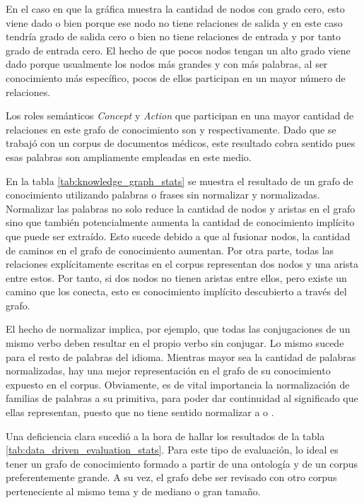 En el caso en que la gráfica muestra la cantidad de nodos con grado cero, esto viene dado o bien porque ese nodo no tiene relaciones de salida y en este caso tendría grado de salida cero o bien no tiene relaciones de entrada y por tanto grado de entrada cero. El hecho de que pocos nodos tengan un alto grado viene dado porque usualmente los nodos más grandes y con más palabras, al ser conocimiento más específico, pocos de ellos participan en un mayor número de relaciones.

Los roles semánticos \textit{Concept} y \textit{Action} que participan en una mayor cantidad de relaciones en este grafo de conocimiento son  y  respectivamente. Dado que se trabajó con un corpus de documentos médicos, este resultado cobra sentido pues esas palabras son ampliamente empleadas en este medio.

En la tabla \ref{tab:knowledge_graph_stats} se muestra el resultado de un grafo de conocimiento utilizando palabras o frases sin normalizar y normalizadas. Normalizar las palabras no solo reduce la cantidad de nodos y aristas en el grafo sino que también potencialmente aumenta la cantidad de conocimiento implícito que puede ser extraído. Esto sucede debido a que al fusionar nodos, la cantidad de caminos en el grafo de conocimiento aumentan. Por otra parte, todas las relaciones explícitamente escritas en el corpus representan dos nodos y una arista entre estos. Por tanto, si dos nodos no tienen aristas entre ellos, pero existe un camino que los conecta, esto es conocimiento implícito descubierto a través del grafo.

El hecho de normalizar implica, por ejemplo, que todas las conjugaciones de un mismo verbo deben resultar en el propio verbo sin conjugar. Lo mismo sucede para el resto de palabras del idioma. Mientras mayor sea la cantidad de palabras normalizadas, hay una mejor representación en el grafo de su conocimiento expuesto en el corpus. Obviamente, es de vital importancia la normalización de familias de palabras a su primitiva, para poder dar continuidad al significado que ellas representan, puesto que no tiene sentido normalizar  a  o .

Una deficiencia clara sucedió a la hora de hallar los resultados de la tabla \ref{tab:data_driven_evaluation_stats}. Para este tipo de evaluación, lo ideal es tener un grafo de conocimiento formado a partir de una ontología y de un corpus preferentemente grande. A su vez, el grafo debe ser revisado con otro corpus perteneciente al mismo tema y de mediano o gran tamaño.


